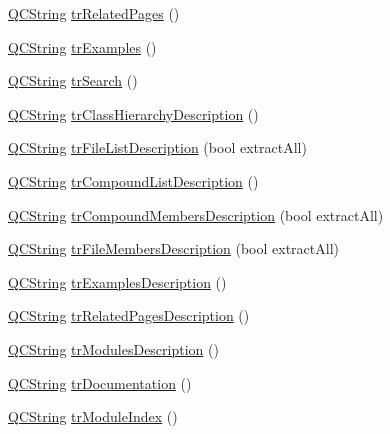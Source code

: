 \begin{DoxyCompactItemize}
\item 
\mbox{\hyperlink{class_q_c_string}{Q\+C\+String}} \mbox{\hyperlink{class_translator_portuguese_ae0f4e2c0d05a32977ca08ddefad9ca1f}{tr\+Related\+Pages}} ()
\item 
\mbox{\hyperlink{class_q_c_string}{Q\+C\+String}} \mbox{\hyperlink{class_translator_portuguese_af6b3271c54d8083d9a2a91a737b4e2f8}{tr\+Examples}} ()
\item 
\mbox{\hyperlink{class_q_c_string}{Q\+C\+String}} \mbox{\hyperlink{class_translator_portuguese_a0197c0988d3e7af1baf12764e67c8592}{tr\+Search}} ()
\item 
\mbox{\hyperlink{class_q_c_string}{Q\+C\+String}} \mbox{\hyperlink{class_translator_portuguese_aee36524c0b27b8223292c60f3ae48be2}{tr\+Class\+Hierarchy\+Description}} ()
\item 
\mbox{\hyperlink{class_q_c_string}{Q\+C\+String}} \mbox{\hyperlink{class_translator_portuguese_a837813311f9a4dbc0f7ec4aa9d1b8f24}{tr\+File\+List\+Description}} (bool extract\+All)
\item 
\mbox{\hyperlink{class_q_c_string}{Q\+C\+String}} \mbox{\hyperlink{class_translator_portuguese_a7bca0e0a84cb275ebdd1322183593ffa}{tr\+Compound\+List\+Description}} ()
\item 
\mbox{\hyperlink{class_q_c_string}{Q\+C\+String}} \mbox{\hyperlink{class_translator_portuguese_aabde76a5a9e8d21c289609f9b7f7065b}{tr\+Compound\+Members\+Description}} (bool extract\+All)
\item 
\mbox{\hyperlink{class_q_c_string}{Q\+C\+String}} \mbox{\hyperlink{class_translator_portuguese_a444f40e7a8ab2d3c6167220ec3a43b46}{tr\+File\+Members\+Description}} (bool extract\+All)
\item 
\mbox{\hyperlink{class_q_c_string}{Q\+C\+String}} \mbox{\hyperlink{class_translator_portuguese_a2923bc757e192fb65a4c22ae7298bb51}{tr\+Examples\+Description}} ()
\item 
\mbox{\hyperlink{class_q_c_string}{Q\+C\+String}} \mbox{\hyperlink{class_translator_portuguese_a59f2f6a19ff379367a1a013c6fa81e61}{tr\+Related\+Pages\+Description}} ()
\item 
\mbox{\hyperlink{class_q_c_string}{Q\+C\+String}} \mbox{\hyperlink{class_translator_portuguese_a254dcfdbf76d284abdb0d03db54fc5f0}{tr\+Modules\+Description}} ()
\item 
\mbox{\hyperlink{class_q_c_string}{Q\+C\+String}} \mbox{\hyperlink{class_translator_portuguese_afa49d1abe37028f7b3defd3f067157ed}{tr\+Documentation}} ()
\item 
\mbox{\hyperlink{class_q_c_string}{Q\+C\+String}} \mbox{\hyperlink{class_translator_portuguese_a98d569061b576d52ac3a20485a3bea74}{tr\+Module\+Index}} ()

\end{DoxyCompactItemize}
